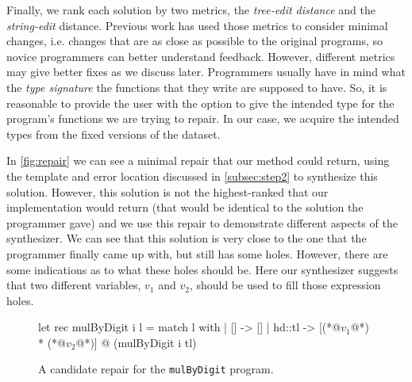  Finally, we rank each solution by two metrics, the
\emph{tree-edit distance} and the \emph{string-edit} distance. Previous work has
used those metrics to consider minimal changes, i.e. changes that are as close
as possible to the original programs, so novice programmers can better
understand feedback. However, different metrics may give better fixes as we
discuss later. Programmers usually have in mind what the \emph{type signature}
the functions that they write are supposed to have. So, it is reasonable to
provide the user with the option to give the intended type for the program's
functions we are trying to repair. In our case, we acquire the intended types
from the fixed versions of the dataset.

 In \autoref{fig:repair} we can see a minimal repair that our
method could return, using the template and error location discussed in
\autoref{subsec:step2} to synthesize this solution. However, this solution is
not the highest-ranked that our implementation would return (that would be
identical to the solution the programmer gave) and we use this repair to
demonstrate different aspects of the synthesizer. We can see that this solution
is very close to the one that the programmer finally came up with, but still has
some holes. However, there are some indications as to what these holes should
be. Here our synthesizer suggests that two different variables, $v_1$ and $v_2$,
should be used to fill those expression holes.

\begin{figure}[ht]
\begin{ecode}
let rec mulByDigit i l =
  match l with
  | []     -> []
  | hd::tl -> [(*@$v_1$@*) * (*@$v_2$@*)] @ (mulByDigit i tl)
\end{ecode}
\caption{A candidate repair for the \texttt{mulByDigit} program.}
\label{fig:repair}
\end{figure}
